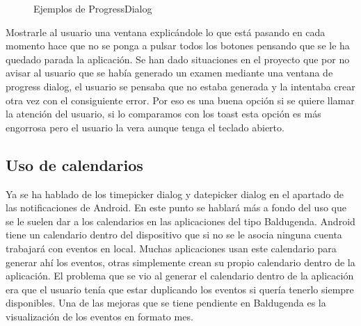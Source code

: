 \begin{figure}[H] 
  \begin{center} 
    \caption{Ejemplos de ProgressDialog} 
    \label{fig:ProgressDialog} 
  \end{center} 
\end{figure}

Mostrarle al usuario una ventana explicándole lo que está pasando en cada momento hace que no se ponga a pulsar todos los botones pensando que se le ha quedado parada la aplicación.
Se han dado situaciones en el proyecto que por no avisar al usuario que se había generado un examen mediante una ventana de progress dialog, el usuario se pensaba que no estaba generada y la intentaba crear otra vez con el consiguiente error.
Por eso es una buena opción si se quiere llamar la atención del usuario, si lo comparamos con los toast esta opción es más engorrosa pero el usuario la vera aunque tenga el teclado abierto.

\subsection{Uso de calendarios}
\label{subsecc:Uso de calendarios}

Ya se ha hablado de los timepicker dialog y datepicker dialog en el apartado de las notificaciones de Android.
En este punto se hablará más a fondo del uso que se le suelen dar a los calendarios en las aplicaciones del tipo Baldugenda.
Android tiene un calendario dentro del dispositivo que si no se le asocia ninguna cuenta trabajará con eventos en local. Muchas aplicaciones usan este calendario para generar ahí los eventos, otras simplemente crean su propio calendario dentro de la aplicación.
El problema que se vio al generar el calendario dentro de la aplicación era que el usuario tenía que estar duplicando los eventos si quería tenerlo siempre disponibles.
Una de las mejoras que se tiene pendiente en Baldugenda es la visualización de los eventos en formato mes.


